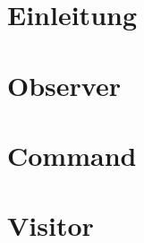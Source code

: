 \documentclass[a4paper,11pt]{scrreprt}
\begin{document}
	



\tableofcontents %

\chapter{Einleitung}


\chapter{Observer}



%


\chapter{Command}






\chapter{Visitor}










\end{document}
